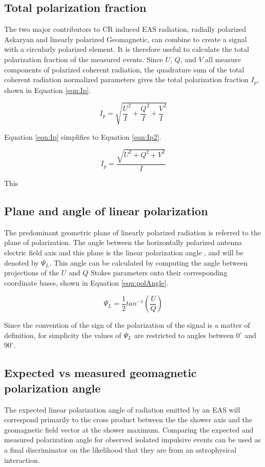 	
	\subsection{Total polarization fraction}
		The two major contributors to CR induced EAS radiation, radially polarized Askaryan and linearly polarized Geomagnetic, can combine to create a signal with a circularly polarized element.  It is therefore useful to calculate the total polarization fraction of the measured events.  Since $U$, $Q$, and $V$ all measure components of polarized coherent radiation, the quadrature sum of the total coherent radiation normalized parameters gives the total polarization fraction $I_{p}$, shown in Equation \ref{eqn:Ip}.
		
	\begin{equation}
		I_p = \sqrt{\frac{U}{I}^2 + \frac{Q}{I}^2 + \frac{V}{I}^2}
	\label{eqn:Ip}
	\end{equation}

		Equation \ref{eqn:Ip} simplifies to Equation \ref{eqn:Ip2}.
		
	\begin{equation}
		I_p = \frac{\sqrt{U^2 + Q^2 + V^2}}{I}
	\label{eqn:Ip2}
	\end{equation}

		This 
	\subsection{Plane and angle of linear polarization}
		The predominant geometric plane of linearly polarized radiation is referred to the plane of polarization.  The angle between the horizontally polarized antenna electric field axis and this plane is the linear polarization angle , and will be denoted by $\Psi_{L}$.  This angle can be calculated by computing the angle between projections of the $U$ and $Q$ Stokes parameters onto their corresponding coordinate bases, shown in Equation \ref{eqn:polAngle}.
	
	\begin{equation}
		\Psi_{L} = \frac{1}{2}tan^{-1}(\frac{U}{Q})
	\label{eqn:polAngle}
	\end{equation}
		
		Since the convention of the sign of the polarization of the signal is a matter of definition, for simplicity the values of $\Psi_{L}$ are restricted to angles between $0^\circ$ and $90^\circ$.
		
	\subsection{Expected vs measured geomagnetic polarization angle}
		The expected linear polarization angle of radiation emitted by an EAS will correspond primarily to the cross product between the the shower axis and the geomagnetic field vector at the shower maximum.  Comparing the expected and measured polarization angle for observed isolated impulsive events can be used as a final discriminator on the likelihood that they are from an astrophysical interaction.  
		
